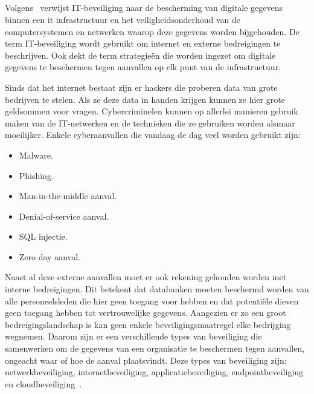 \subsection{}
\label{subsec:IT security}
\subsubsection{}
\label{subsec:Wat valt er onder IT security?}
Volgens~\textcite{Kieron2020} verwijst IT-beveiliging naar de bescherming van digitale gegevens binnen een it infrastructuur en het veiligheidsonderhoud van de computersystemen en netwerken waarop deze gegevens worden bijgehouden. De term IT-beveiliging wordt gebruikt om internet en externe bedreigingen te beschrijven. Ook dekt de term strategieën die worden ingezet om digitale gegevens te beschermen tegen aanvallen op elk punt van de infrastructuur. 

Sinds dat het internet bestaat zijn er hackers die proberen data van grote bedrijven te stelen. Als ze deze data in handen krijgen kunnen ze hier grote geldsommen voor vragen. Cybercriminelen kunnen op allerlei manieren gebruik maken van de IT-netwerken en de technieken die ze gebruiken worden alsmaar moeilijker. Enkele cyberaanvallen die vandaag de dag veel worden gebruikt zijn:
\begin{itemize}
    \item Malware.
    \item Phishing.
    \item Man-in-the-middle aanval.
    \item Denial-of-service aanval.
    \item SQL injectie.
    \item Zero day aanval.
\end{itemize}
Naast al deze externe aanvallen moet er ook rekening gehouden worden met interne bedreigingen. Dit betekent dat databanken moeten beschermd worden van alle personeelsleden die hier geen toegang voor hebben en dat potentiële dieven geen toegang hebben tot vertrouwelijke gegevens. Aangezien er zo een groot bedreigingslandschap is kan geen enkele beveiligingsmaatregel elke bedrijging wegnemen. Daarom zijn er een verschillende types van beveiliging die samenwerken om de gegevens van een organisatie te beschermen tegen aanvallen, ongeacht waar of hoe de aanval plaatsvindt. Deze types van beveiliging zijn: netwerkbeveiliging, internetbeveiliging, applicatiebeveiliging, endpointbeveiliging en cloudbeveiliging~\autocite{Kieron2020}. 

